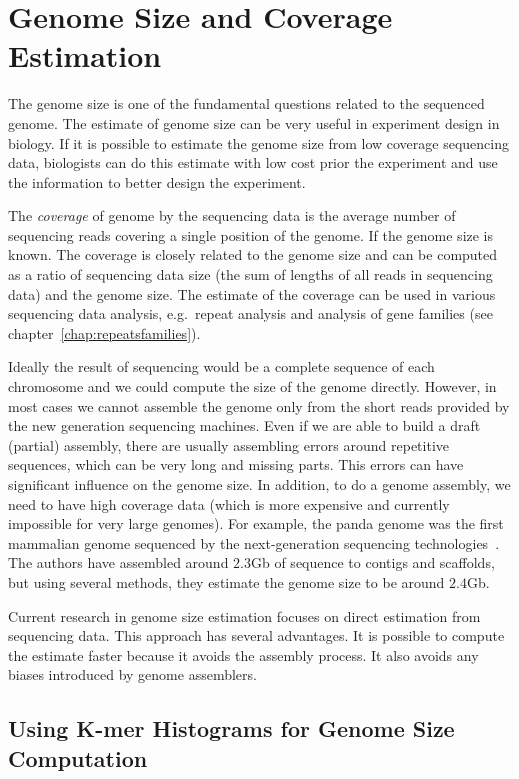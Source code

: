 \chapter{Genome Size and Coverage Estimation}

The genome size is one of the fundamental questions related to the sequenced genome.
The estimate of genome size can be very useful in experiment design in biology. If it is possible to estimate the genome size from low coverage sequencing data, biologists can do this estimate with low cost prior the experiment and use the information to better design the experiment.

The \emph{coverage} of genome by the sequencing data is the average number of sequencing reads covering a single position of the genome. If the genome size is known. The coverage is closely related to the genome size and can be computed as a ratio of sequencing data size (the sum of lengths of all reads in sequencing data) and the genome size. The estimate of the coverage can be used in various sequencing data analysis, e.g.\ repeat analysis and analysis of gene families (see chapter~\ref{chap:repeatsfamilies}).

Ideally the result of sequencing would be a complete sequence of each chromosome and we could compute the size of the genome directly.
However, in most cases we cannot assemble the genome only from the short reads provided by the new generation sequencing machines.
Even if we are able to build a draft (partial) assembly, there are usually assembling errors around repetitive sequences, which can be very long and missing parts. This errors can have significant influence on the genome size. In addition, to do a genome assembly, we need to have high coverage data (which is more expensive and currently impossible for very large genomes). For example, the panda genome was the first mammalian genome sequenced
by the next-generation sequencing technologies~\cite{li2010panda}. The authors have assembled around $2.3$Gb of sequence to contigs and scaffolds, but using
several methods, they estimate the genome size to be around $2.4$Gb.

Current research in genome size estimation focuses on direct estimation from sequencing data. This approach has several advantages. It is possible to compute the estimate faster because it avoids the assembly process. It also avoids any biases introduced by genome assemblers.

\section{Using K-mer Histograms for Genome Size Computation}

